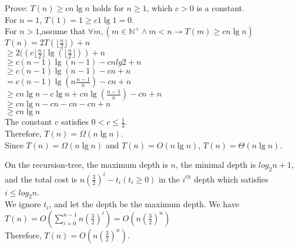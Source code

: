 \documentclass[a4paper, justified]{tufte-handout}
\begin{document}
\begin{solution}
  Prove: $T(n)\geq cn\lg n$ holds for $n\geq 1$,  which $c>0$ is a constant.\\
  For $n=1$, $T(1)=1\geq c1\lg 1=0$.\\
  For $n>1$,assume that $\forall m,(m\in\mathbb{N}^{+}\land m<n\to T(m)\geq cn\lg n)$\\
  $T(n)=2 T(\lfloor \frac{n}{2}\rfloor)+n$\\
  \hspace*{2.5em}$\geq 2((c \lfloor \frac{n}{2} \rfloor \lg(\lfloor \frac{n}{2}\rfloor))+n$\\
  \hspace*{2.5em}$\geq c(n-1)\lg(n-1)-cnlg2+n$\\
  \hspace*{2.5em}$\geq c(n-1)\lg(n-1)-cn+n$\\
  \hspace*{2.5em}$= c(n-1)\lg(n\frac{n-1}{n})-cn+n$\\
  \hspace*{2.5em}$\geq cn\lg n -c\lg n+cn\lg (\frac{n-1}{n})-cn+n$\\
  \hspace*{2.5em}$\geq cn\lg n -cn-cn-cn+n$\\
  \hspace*{2.5em}$\geq cn\lg n$\\
  The constant $c$ satisfies $0<c\leq\frac{1}{3}$.\\
  Therefore, $T(n)=\Omega(n \lg n)$.\\
  Since $T(n)=\Omega(n \lg n)$ and $T(n)=O(n\lg n)$, $T(n)=\Theta(n \lg n)$.
\end{solution}

\begin{problem}[TC 4.4-5]
\end{problem}

\begin{solution}
  On the  recursion-tree, the maximum depth is  $n$, the minimal depth is $log_2{n}+1$, and the total cost is  $n(\frac{3}{2})^i-t_i(t_i\geq 0)$  in the $i^{th}$ depth which satisfies $i\leq log_2{n}$.\\
  We ignore $t_i$, and let the depth be the maximum depth. We have\\
  $T(n)=O(\sum\limits_{i=0}^{n-1}n(\frac{3}{2})^i)=O(n(\frac{3}{2})^n)$\\
  Therefore, $T(n)=O(n(\frac{3}{2})^n)$.
\end{solution}
\end{document}
